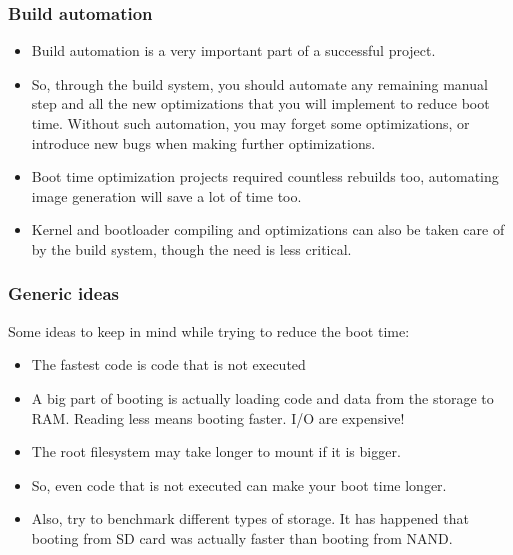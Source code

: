 \begin{frame}
\frametitle{Build automation}
\begin{itemize}
\item Build automation is a very important part of a successful project.
\item So, through the build system, you should automate any remaining
      manual step and all the new optimizations that you will implement
      to reduce boot time. Without such automation, you may forget some
      optimizations, or introduce new bugs when making further optimizations.
\item Boot time optimization projects required countless rebuilds too,
      automating image generation will save a lot of time too.
\item Kernel and bootloader compiling and optimizations can also be
      taken care of by the build system, though the need is less critical.
\end{itemize}
\end{frame}

\begin{frame}
\frametitle{Generic ideas}
Some ideas to keep in mind while trying to reduce the boot time:
\begin{itemize}
\item The fastest code is code that is not executed
\item A big part of booting is actually loading code and data from the
      storage to RAM. Reading less means booting faster. I/O are
      expensive!
\item The root filesystem may take longer to mount if it is bigger.
\item So, even code that is not executed can make your boot time
      longer.
\item Also, try to benchmark different types of storage. It has
      happened that booting from SD card was actually faster than
      booting from NAND.
\end{itemize}
\end{frame}
